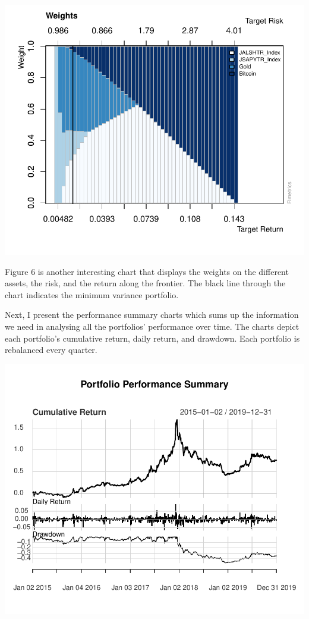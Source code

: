 \documentclass[11pt,preprint, authoryear]{elsarticle}
\numberwithin{equation}{section}
\numberwithin{figure}{section}
\numberwithin{table}{section}
\begin{document}
\includegraphics{FinMetrics-Essay_files/figure-latex/unnamed-chunk-13-1.pdf}

Figure 6 is another interesting chart that displays the weights on the
different assets, the risk, and the return along the frontier. The black
line through the chart indicates the minimum variance portfolio.

Next, I present the performance summary charts which sums up the
information we need in analysing all the portfolios' performance over
time. The charts depict each portfolio's cumulative return, daily
return, and drawdown. Each portfolio is rebalanced every quarter.

\includegraphics{FinMetrics-Essay_files/figure-latex/unnamed-chunk-15-1.pdf}
\end{document}
